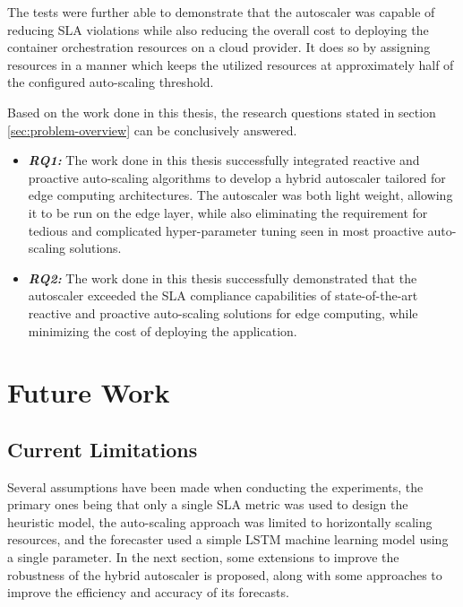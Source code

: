 The tests were further able to demonstrate that the autoscaler was capable of reducing SLA violations while also reducing the overall cost to deploying the container orchestration resources on a cloud provider. It does so by assigning resources in a manner which keeps the utilized resources at approximately half of the configured auto-scaling threshold.\par

Based on the work done in this thesis, the research questions stated in section \ref{sec:problem-overview} can be conclusively answered.

\begin{itemize}
    \item \textbf{\textit{RQ1:}} The work done in this thesis successfully integrated reactive and proactive auto-scaling algorithms to develop a hybrid autoscaler tailored for edge computing architectures. The autoscaler was both light weight, allowing it to be run on the edge layer, while also eliminating the requirement for tedious and complicated hyper-parameter tuning seen in most proactive auto-scaling solutions.
    \item \textbf{\textit{RQ2:}} The work done in this thesis successfully demonstrated that the autoscaler exceeded the SLA compliance capabilities of state-of-the-art reactive and proactive auto-scaling solutions for edge computing, while minimizing the cost of deploying the application.
\end{itemize}

\section{Future Work}
\label{sec:ch6-future-work}

\subsection{Current Limitations}
\label{subsec:ch6-limitations}

Several assumptions have been made when conducting the experiments, the primary ones being that only a single SLA metric was used to design the heuristic model, the auto-scaling approach was limited to horizontally scaling resources, and the forecaster used a simple LSTM machine learning model using a single parameter. In the next section, some extensions to improve the robustness of the hybrid autoscaler is proposed, along with some approaches to improve the efficiency and accuracy of its forecasts.\par
{}

